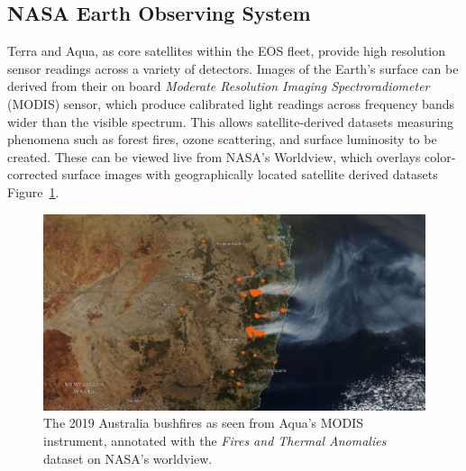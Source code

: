
\subsection{NASA Earth Observing System}


Terra and Aqua, as core satellites within the EOS fleet, provide high resolution sensor readings across a variety of detectors.
Images of the Earth's surface can be derived from their on board \textit{Moderate Resolution Imaging Spectroradiometer} (MODIS) sensor, which produce calibrated light readings across frequency bands wider than the visible spectrum.
This allows satellite-derived datasets measuring phenomena such as forest fires, ozone scattering, and surface luminosity to be created.
These can be viewed live from NASA's Worldview, which overlays color-corrected surface images with geographically located satellite derived datasets Figure~\ref{fig:bushfire}.

\begin{figure}
    \centering
    \includegraphics[width=\columnwidth]{diagrams/bushfire.png}
    \caption{The 2019 Australia bushfires as seen from Aqua's MODIS instrument, annotated with the \textit{Fires and Thermal Anomalies} dataset on NASA's worldview.\protect\footnotemark}
    \label{fig:bushfire}
\end{figure}


